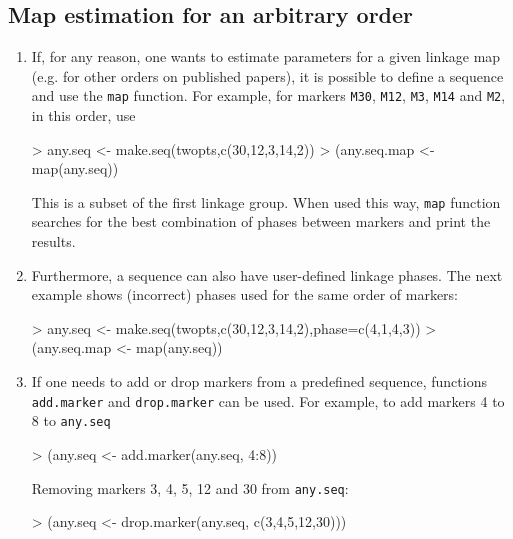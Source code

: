 \documentclass[letterpaper,12pt,oneside]{article}
\begin{document}
\subsection{Map estimation for an arbitrary order}
\label{arbitrary}
\begin{enumerate}
\item If, for any reason, one wants to estimate parameters for a given linkage map (e.g. for other orders on published papers), it is possible to define a sequence and use the {\tt map} function. For example, for markers {\tt M30}, {\tt M12}, {\tt M3}, {\tt M14} and {\tt M2}, in this order, use
  
\begin{Schunk}
\begin{Sinput}
> any.seq <- make.seq(twopts,c(30,12,3,14,2))
> (any.seq.map <- map(any.seq))
\end{Sinput}
\end{Schunk}
This is a subset of the first linkage group. When used this way, {\tt map} function searches for the best combination of phases between markers and print the results.

\item Furthermore, a sequence can also have user-defined linkage phases. The next example shows (incorrect) phases used for the same order of markers:
\begin{Schunk}
\begin{Sinput}
> any.seq <- make.seq(twopts,c(30,12,3,14,2),phase=c(4,1,4,3))
> (any.seq.map <- map(any.seq))
\end{Sinput}
\end{Schunk}

\item If one needs to add or drop markers from a predefined sequence, functions {\tt add.marker} and {\tt drop.marker} can be used. For example, to add markers 4 to 8 to {\tt any.seq}
\begin{Schunk}
\begin{Sinput}
> (any.seq <- add.marker(any.seq, 4:8))
\end{Sinput}
\end{Schunk}

Removing markers 3, 4, 5, 12 and 30 from {\tt any.seq}: 
\begin{Schunk}
\begin{Sinput}
> (any.seq <- drop.marker(any.seq, c(3,4,5,12,30)))
\end{Sinput}
\end{Schunk}
\end{enumerate}
\end{document}
